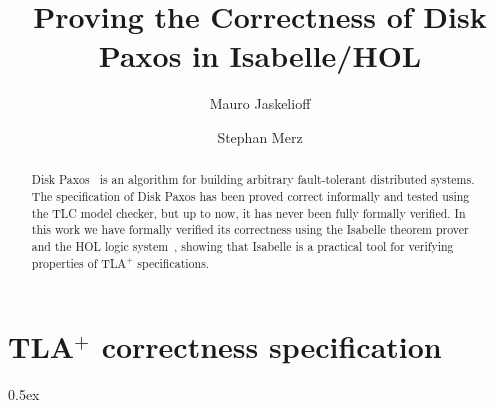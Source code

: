 \documentclass[11pt,a4paper]{article}
\begin{document}
\title{Proving the Correctness of Disk Paxos in Isabelle/HOL}
\author{Mauro Jaskelioff\and Stephan Merz}
\maketitle

\begin{abstract}
  Disk Paxos~\cite{Gafni00disk} is an algorithm for building arbitrary
  fault-tolerant distributed systems. The specification of Disk Paxos
  has been proved correct informally and tested using the TLC model
  checker, but up to now, it has never been fully formally verified.
  In this work we have formally verified its correctness using the
  Isabelle theorem prover and the HOL logic
  system~\cite{Nipkow-Paulson-Wenzel:2002}, showing that Isabelle is a
  practical tool for verifying properties of TLA$^{+}$ specifications.
\end{abstract}

\tableofcontents





\appendix

\section{TLA$^{+}$ correctness specification}
\label{ap:correctness}

\tla

\notla
\parindent 0pt\parskip 0.5ex



%
%
\end{document}
